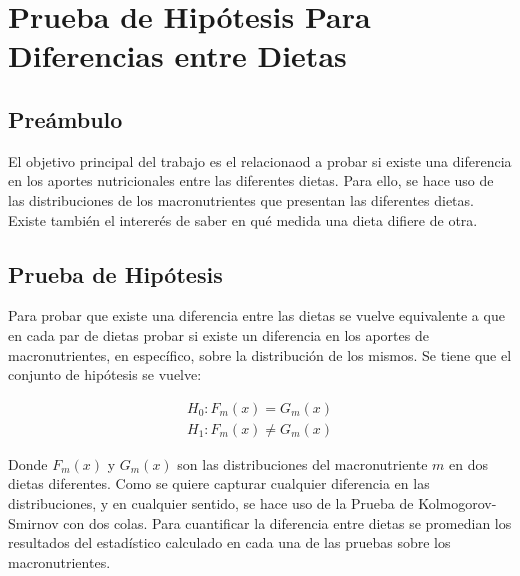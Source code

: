 \documentclass[12pt,a4paper]{article}
\begin{document}
\newpage

\section{Prueba de Hipótesis Para Diferencias entre Dietas}
    \subsection{Preámbulo}
    {
        El objetivo principal del trabajo es el relacionaod a probar si 
        existe una diferencia en los aportes nutricionales entre las diferentes 
        dietas. Para ello, se hace uso de las distribuciones de los macronutrientes 
        que presentan las diferentes dietas. Existe también el intererés de saber 
        en qué medida una dieta difiere de otra.
    }

    \subsection{Prueba de Hipótesis}
    {
        Para probar que existe una diferencia entre las dietas se vuelve equivalente 
        a que en cada par de dietas probar si existe un diferencia en los aportes 
        de macronutrientes, en específico, sobre la distribución de los mismos. 
        Se tiene que el conjunto de hipótesis se vuelve:
        
        \begin{align*}
            H_0 : F_m(x) = G_m(x) \\
            H_1 : F_m(x) \ne G_m(x)
        \end{align*}

        Donde $F_m(x)$ y $G_m(x)$ son las distribuciones del macronutriente $m$ en 
        dos dietas diferentes. Como se quiere capturar cualquier diferencia en las 
        distribuciones, y en cualquier sentido, se hace uso de la Prueba de 
        Kolmogorov-Smirnov con dos colas. Para cuantificar la diferencia entre dietas 
        se promedian los resultados del estadístico calculado en cada una de las pruebas 
        sobre los macronutrientes.
    }
\end{document}

